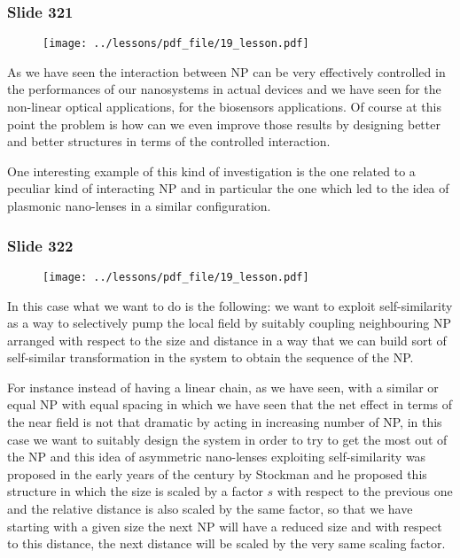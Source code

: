 \documentclass[../main/main.tex]{subfiles}
\begin{document}
\newpage

\subsubsection{Slide 321}

\begin{figure}[h!]
\centering
\texttt{[image: ../lessons/pdf\_file/19\_lesson.pdf]}
\end{figure}

As we have seen the interaction between NP can be very effectively controlled in the performances of our nanosystems in actual devices and we have seen for the non-linear optical applications, for the biosensors applications. Of course at this point the problem is how can we even improve those results by designing better and better structures in terms of the controlled interaction.

One interesting example of this kind of investigation is the one related to a peculiar kind of interacting NP and in particular the one which led to the idea of plasmonic nano-lenses in a similar configuration. 

\newpage

\subsubsection{Slide 322}

\begin{figure}[h!]
\centering
\texttt{[image: ../lessons/pdf\_file/19\_lesson.pdf]}
\end{figure}

In this case what we want to do is the following: we want to exploit self-similarity as a way to selectively pump the local field by suitably coupling neighbouring NP arranged with respect to the size and distance in a way that we can build sort of self-similar transformation in the system to obtain the sequence of the NP. 

For instance instead of having a linear chain, as we have seen, with a similar or equal NP with equal spacing in which we have seen that the net effect in terms of the near field is not that dramatic by acting in increasing number of NP, in this case we want to suitably design the system in order to try to get the most out of the NP and this idea of asymmetric nano-lenses exploiting self-similarity was proposed in the early years of the century by Stockman and he proposed this structure in which the size is scaled by a factor $s$ with respect to the previous one and the relative distance is also scaled by the same factor, so that we have starting with a given size the next NP will have a reduced size and with respect to this distance, the next distance will be scaled by the very same scaling factor.
\end{document}
